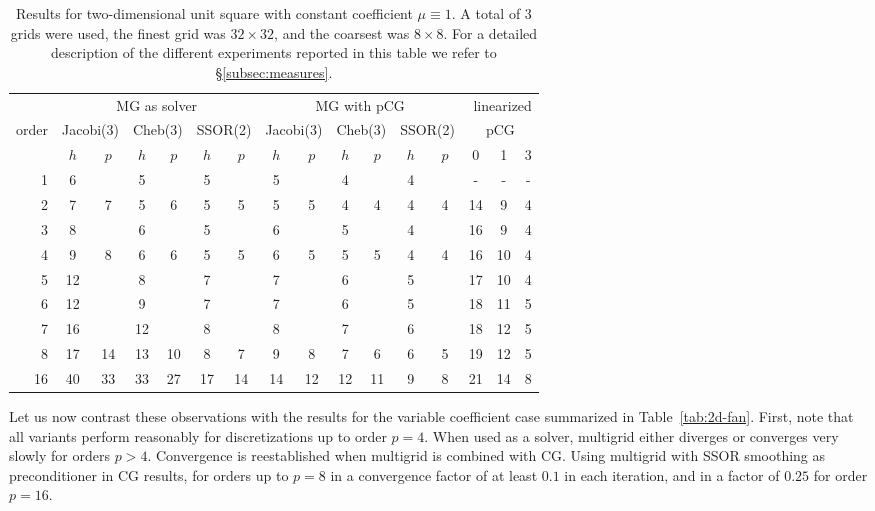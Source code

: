 \documentclass[smallcondensed,final]{svjour3}     %
\newcommand{\gsnote}[1]{\textcolor{blue}{GS: #1}}
\begin{document}

\begin{table}
  \caption{\label{tab:box} Results for two-dimensional unit square
    with constant coefficient $\mu\equiv 1$.  A total of 3 grids were
    used, the finest grid was $32\times 32$, and the coarsest was
    $8\times 8$. For a detailed description of the different
    experiments reported in this table we refer to
    \S\ref{subsec:measures}.}  \centering
  \begin{tabular}{|r|c c|c c|c c||c c|c c|c c||c c c|} 
    \hline
    & \multicolumn{6}{c||}{MG as solver} & \multicolumn{6}{c||}{MG with pCG} & \multicolumn{3}{r|}{linearized} \\
    \cline{2-13}
    \!\!\! order \!\!\!\! &  \multicolumn{2}{c|}{\!\scriptsize  Jacobi(3)\!} &  \multicolumn{2}{c|}{\!\scriptsize Cheb(3)\!} & \multicolumn{2}{c||}{\!\scriptsize  SSOR(2)\!} & \multicolumn{2}{c|}{\!\scriptsize Jacobi(3)\!} &  \multicolumn{2}{c|}{\!\scriptsize Cheb(3)\!} & \multicolumn{2}{c||}{\!\scriptsize SSOR(2)\!} & \multicolumn{3}{c|}{pCG}\\
\hline
 & $h$ & $p$ & $h$ & $p$& $h$ & $p$& $h$ & $p$& $h$ & $p$& $h$ & $p$& 0 & 1 & 3\\
 \cline{2-16}
1 & 6 & & 5 & & 5 & & 5 & & 4 & & 4 & & - & - & - \\
2 & 7 & 7 & 5 & 6 & 5 & 5 & 5 & 5 & 4 & 4 & 4 & 4 & 14 & 9 & 4 \\
3 & 8 & & 6 & & 5 & & 6 & & 5 & & 4 & & 16 & 9 & 4 \\
4 & 9 & 8 & 6 & 6 & 5 & 5 & 6 & 5 & 5 & 5 & 4 & 4 & 16 & 10 & 4 \\
5 & 12 & & 8 & & 7 & & 7 & & 6 & & 5 & & 17 & 10 & 4 \\
6 & 12 & & 9 & & 7 & & 7 & & 6 & & 5 & & 18 & 11 & 5\\
7 & 16 & & 12 & & 8 & & 8 & & 7 & & 6 & & 18 & 12 & 5 \\
8 & 17 & 14 & 13 & 10 & 8 & 7 & 9 & 8 & 7 & 6 & 6 & 5 & 19 & 12 & 5\\
16 & 40 & 33 & 33 & 27 & 17 & 14 & 14 & 12 & 12 & 11 & 9 & 8 & 21 & 14 & 8 \\
\hline
  \end{tabular}
\end{table}


Let us now contrast these observations with the results for the
variable coefficient case summarized in Table~\ref{tab:2d-fan}. First,
note that all variants perform reasonably for discretizations up to
order $p=4$. When used as a solver, multigrid either diverges or
converges very slowly for orders $p>4$. Convergence is reestablished
when multigrid is combined with CG. Using multigrid with SSOR
smoothing as preconditioner in CG results, for orders up to $p=8$ in a
convergence factor of at least $0.1$ in each iteration, and in a
factor of $0.25$ for order $p=16$.
\end{document}

